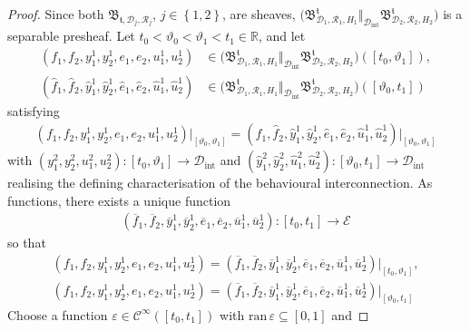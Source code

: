 \documentclass[preprint,12pt]{elsarticle}
\theoremstyle{definition}
\newcommand{\ran}{\mathrm{ran}\,}
\newcommand{\set}[1]{\left\lbrace #1\right\rbrace}
\begin{document}
\begin{proof}
Since both $\mathfrak{B}_{\mathfrak{t},\mathcal{D}_j,\mathcal{R}_j}$, $j\in\set{1,2}$, are sheaves, $\big(\mathfrak{B}^{\mathfrak{t}}_{\mathcal{D}_1,\mathcal{R}_1,H_1}\Vert_{\mathcal{D}_{\mathrm{int}}}\mathfrak{B}^{\mathfrak{t}}_{\mathcal{D}_2,\mathcal{R}_2,H_2}\big)$ is a separable presheaf. Let $t_0<\vartheta_0<\vartheta_1<t_1\in\mathbb{R}$, and let 
\begin{align*}
(f_1,f_2,y_1^1,y_2^1,e_1,e_2,u_1^1,u_2^1) & \in\big(\mathfrak{B}^{\mathfrak{t}}_{\mathcal{D}_1,\mathcal{R}_1,H_1}\Vert_{\mathcal{D}_{\mathrm{int}}}\mathfrak{B}^{\mathfrak{t}}_{\mathcal{D}_2,\mathcal{R}_2,H_2}\big)([t_0,\vartheta_1]),\\
(\widehat{f}_1,\widehat{f}_2,\widehat{y}_1^1,\widehat{y}_2^1,\widehat{e}_1,\widehat{e}_2,\widehat{u}_1^1,\widehat{u}_2^1) & \in\big(\mathfrak{B}^{\mathfrak{t}}_{\mathcal{D}_1,\mathcal{R}_1,H_1}\Vert_{\mathcal{D}_{\mathrm{int}}}\mathfrak{B}^{\mathfrak{t}}_{\mathcal{D}_2,\mathcal{R}_2,H_2}\big)([\vartheta_0,t_1])
\end{align*}
satisfying
\begin{align*}
(f_1,f_2,y_1^1,y_2^1,e_1,e_2,u_1^1,u_2^1)\vert_{[\vartheta_0,\vartheta_1]} = (\widehat{f}_1,\widehat{f}_2,\widehat{y}_1^1,\widehat{y}_2^1,\widehat{e}_1,\widehat{e}_2,\widehat{u}_1^1,\widehat{u}_2^1)\vert_{[\vartheta_0,\vartheta_1]}
\end{align*}
with $(y_1^2,y_2^2,u_1^2,u_2^2):[t_0,\vartheta_1]\to\mathcal{D}_{\mathrm{int}}$ and $(\widehat{y}_1^2,\widehat{y}_2^2,\widehat{u}_1^2,\widehat{u}_2^2):[\vartheta_0,t_1]\to\mathcal{D}_{\mathrm{int}}$ realising the defining characterisation of the behavioural interconnection. As functions, there exists a unique function
\begin{align*}
(\overline{f}_1,\overline{f}_2,\overline{y}_1^1,\overline{y}_2^1,\overline{e}_1,\overline{e}_2,\overline{u}_1^1,\overline{u}_2^1):[t_0,t_1]\to\mathcal{E}
\end{align*}
so that
\begin{align*}
(f_1,f_2,y_1^1,y_2^1,e_1,e_2,u_1^1,u_2^1) = (\overline{f}_1,\overline{f}_2,\overline{y}_1^1,\overline{y}_2^1,\overline{e}_1,\overline{e}_2,\overline{u}_1^1,\overline{u}_2^1)\vert_{[t_0,\vartheta_1]},\\
(f_1,f_2,y_1^1,y_2^1,e_1,e_2,u_1^1,u_2^1) = (\overline{f}_1,\overline{f}_2,\overline{y}_1^1,\overline{y}_2^1,\overline{e}_1,\overline{e}_2,\overline{u}_1^1,\overline{u}_2^1)\vert_{[\vartheta_0,t_1]}
\end{align*}
Choose a function $\varepsilon\in\mathcal{C}^\infty([t_0,t_1])$ with $\ran\varepsilon\subseteq[0,1]$ and

\end{proof}
\end{document}
